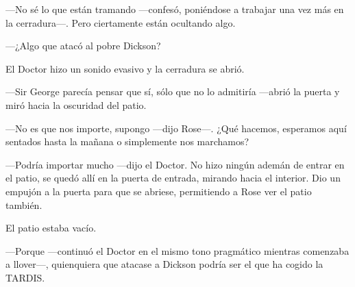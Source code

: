 {---No sé lo que están tramando ---confesó, poniéndose a trabajar una
vez más en la cerradura---. Pero ciertamente están ocultando algo.}

{---¿Algo que atacó al pobre Dickson?}

{El Doctor hizo un sonido evasivo y la cerradura se abrió.}

{---Sir George parecía pensar que sí, sólo que no lo admitiría ---abrió
la puerta y miró hacia la oscuridad del patio.}

{---No es que nos importe, supongo ---dijo Rose---. ¿Qué hacemos,
esperamos aquí sentados hasta la mañana o simplemente nos marchamos?}

{---Podría importar mucho ---dijo el Doctor. No hizo ningún ademán de
entrar en el patio, se quedó allí en la puerta de entrada, mirando hacia
el interior. Dio un empujón a la puerta para que se abriese, permitiendo
a Rose ver el patio también.}

{El patio estaba vacío.}

{---Porque ---continuó el Doctor en el mismo tono pragmático mientras
comenzaba a llover---, quienquiera que atacase a Dickson podría ser el
que ha cogido la TARDIS.}
